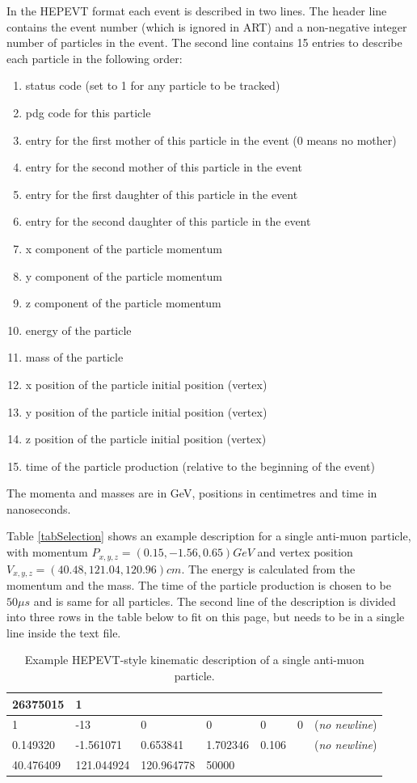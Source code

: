 In the HEPEVT format each event is described in two lines. The header line contains the event number (which is ignored in ART) and a non-negative integer number of particles in the event. The second line contains 15 entries to describe each particle in the following order:
\begin{enumerate}
\item status code (set to 1 for any particle to be tracked)
\item pdg code for this particle
\item entry for the first mother of this particle in the event (0 means no mother)
\item entry for the second mother of this particle in the event
\item entry for the first daughter of this particle in the event
\item entry for the second daughter of this particle in the event
\item x component of the particle momentum 
\item y component of the particle momentum
\item z component of the particle momentum
\item energy of the particle
\item mass of the particle
\item x position of the particle initial position (vertex)
\item y position of the particle initial position (vertex)
\item z position of the particle initial position (vertex)
\item time of the particle production (relative to the beginning of the event)
\end{enumerate}

The momenta and masses are in GeV, positions in centimetres and time in nanoseconds.

Table \ref{tabSelection} shows an example description for a single anti-muon particle, with momentum $P_{x,y,z}=\left(0.15, -1.56, 0.65\right)\unit{GeV}$ and vertex position $V_{x,y,z}=\left(40.48,121.04,120.96\right)\unit{cm}$. The energy is calculated from the momentum and the mass. The time of the particle production is chosen to be $50\unit{\mu s}$  and is same for all particles. The second line of the description is divided into three rows in the table below to fit on this page, but needs to be in a single line inside the text file.
\begin{table}
\centering
\begin{tabular}{llllllr}\hline
26375015 & 1 & & & & &\\ \hline
1 & -13 & 0 & 0 & 0 & 0 & (\textit{no newline})\\ 0.149320 & -1.561071 & 0.653841 & 1.702346 & 0.106 & & (\textit{no newline})\\ 40.476409 & 121.044924 & 120.964778 & 50000 & & &\\\hline
\end{tabular}
\caption{Example HEPEVT-style kinematic description of a single anti-muon particle.}
\label{tabHEPEVTOutput}
\end{table}

